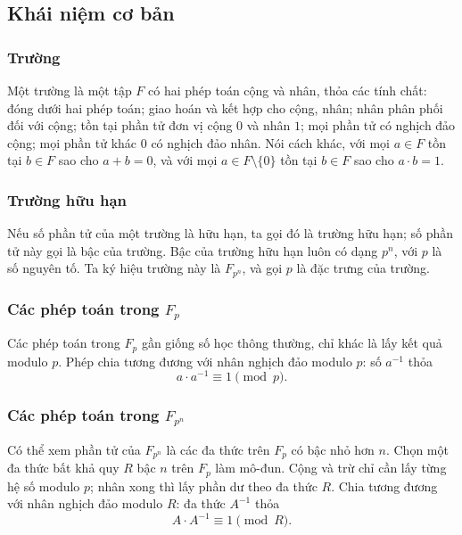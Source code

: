 \documentclass[11pt]{article}
\begin{document}
\subsection{Khái niệm cơ bản}

\subsubsection{Trường}

Một trường là một tập \(F\) có hai phép toán cộng và nhân, thỏa các tính chất:
đóng dưới hai phép toán; giao hoán và kết hợp cho cộng, nhân; nhân phân phối
đối với cộng; tồn tại phần tử đơn vị cộng \(0\) và nhân \(1\); mọi phần tử có
nghịch đảo cộng; mọi phần tử khác \(0\) có nghịch đảo nhân. Nói cách khác, với
mọi \(a\in F\) tồn tại \(b\in F\) sao cho \(a+b=0\), và với mọi
\(a\in F\setminus\{0\}\) tồn tại \(b\in F\) sao cho \(a\cdot b=1\).

\subsubsection{Trường hữu hạn}

Nếu số phần tử của một trường là hữu hạn, ta gọi đó là trường hữu hạn; số phần
tử này gọi là bậc của trường. Bậc của trường hữu hạn luôn có dạng \(p^n\), với
\(p\) là số nguyên tố. Ta ký hiệu trường này là \(F_{p^n}\), và gọi \(p\) là
đặc trưng của trường.

\subsubsection{\texorpdfstring{Các phép toán trong \(F_p\)}{Các phép toán trong Fp}}

Các phép toán trong \(F_p\) gần giống số học thông thường, chỉ khác là lấy kết
quả modulo \(p\). Phép chia tương đương với nhân nghịch đảo modulo \(p\): số
\(a^{-1}\) thỏa
\[
  a\cdot a^{-1}\equiv 1\pmod p.
\]

\subsubsection{\texorpdfstring{Các phép toán trong \(F_{p^n}\)}{Các phép toán trong Fpn}}

Có thể xem phần tử của \(F_{p^n}\) là các đa thức trên \(F_p\) có bậc nhỏ hơn
\(n\). Chọn một đa thức bất khả quy \(R\) bậc \(n\) trên \(F_p\) làm mô-đun.
Cộng và trừ chỉ cần lấy từng hệ số modulo \(p\); nhân xong thì lấy phần dư theo
đa thức \(R\). Chia tương đương với nhân nghịch đảo modulo \(R\): đa thức
\(A^{-1}\) thỏa
\[
  A\cdot A^{-1}\equiv 1\pmod R.
\]
\end{document}
